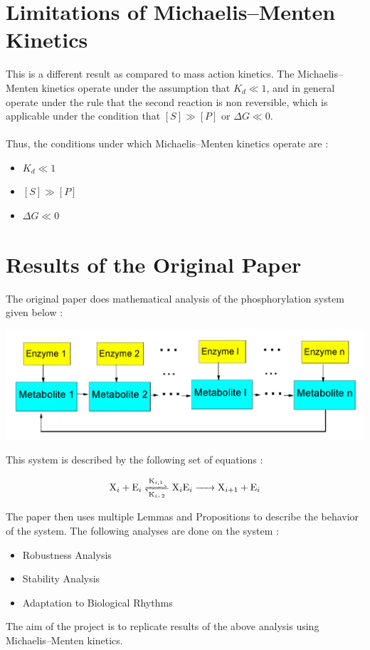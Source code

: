 \section*{Limitations of Michaelis–Menten Kinetics}

\noindent This is a different result as compared to mass 
action kinetics. The Michaelis–Menten kinetics operate under 
the assumption that $K_d \ll 1$, and in general operate under 
the rule that the second reaction is non reversible, which 
is applicable under the condition that $[S] \gg [P]$ or 
$\Delta G \ll 0$.
\\\\
Thus, the conditions under which Michaelis–Menten kinetics 
operate are :
\begin{itemize}
    \item $K_d \ll 1$
    \item $[S] \gg [P]$
    \item $\Delta G \ll 0$
\end{itemize}

\section*{Results of the Original Paper}
The original paper does mathematical analysis of the 
phosphorylation system given below :

\begin{center}
    \includegraphics[scale=0.3]{img/orig-sys.png}
\end{center}

\noindent This system is described by the following 
set of equations :

$$ \ce{X_i + E_i <=>[K_{i,1}][K_i,2] X_iE_i -> X_{i+1} + E_i}$$

\noindent The paper then uses multiple Lemmas and 
Propositions to describe the behavior of the system. The 
following analyses are done on the system :

\begin{itemize}
    \item Robustness Analysis
    \item Stability Analysis
    \item Adaptation to Biological Rhythms
\end{itemize}

\noindent The aim of the project is to replicate results of 
the above analysis using Michaelis–Menten kinetics.